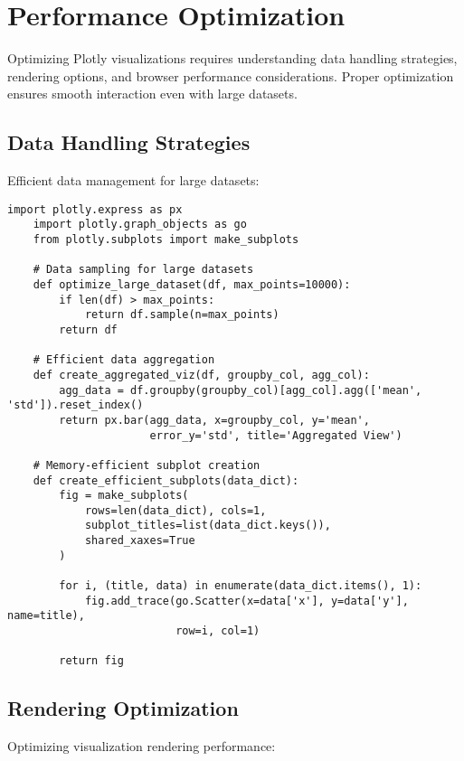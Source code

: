 \section{Performance Optimization}
\label{sec:optimization}

Optimizing Plotly visualizations requires understanding data handling strategies, rendering options, and browser performance considerations. Proper optimization ensures smooth interaction even with large datasets.

\subsection{Data Handling Strategies}
\label{subsec:data_handling}

Efficient data management for large datasets:

\begin{lstlisting}[language=MyPython, caption={Data Optimization Techniques}, label={lst:data_optimization}]
	import plotly.express as px
	import plotly.graph_objects as go
	from plotly.subplots import make_subplots
	
	# Data sampling for large datasets
	def optimize_large_dataset(df, max_points=10000):
	    if len(df) > max_points:
	        return df.sample(n=max_points)
	    return df
	
	# Efficient data aggregation
	def create_aggregated_viz(df, groupby_col, agg_col):
	    agg_data = df.groupby(groupby_col)[agg_col].agg(['mean', 'std']).reset_index()
	    return px.bar(agg_data, x=groupby_col, y='mean', 
	                  error_y='std', title='Aggregated View')
	
	# Memory-efficient subplot creation
	def create_efficient_subplots(data_dict):
	    fig = make_subplots(
	        rows=len(data_dict), cols=1,
	        subplot_titles=list(data_dict.keys()),
	        shared_xaxes=True
	    )
	    
	    for i, (title, data) in enumerate(data_dict.items(), 1):
	        fig.add_trace(go.Scatter(x=data['x'], y=data['y'], name=title), 
	                      row=i, col=1)
	    
	    return fig
\end{lstlisting}

\subsection{Rendering Optimization}
\label{subsec:rendering}

Optimizing visualization rendering performance:

